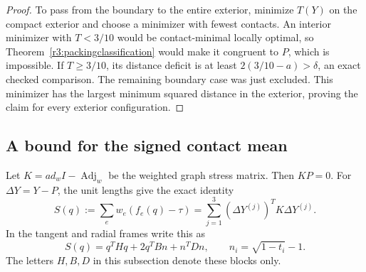 \documentclass[12pt,reqno]{amsart}
\theoremstyle{definition}
\numberwithin{equation}{section}
\begin{document}
\begin{proof}
To pass from the boundary to the entire exterior, minimize $T(Y)$
on the compact exterior and choose a minimizer with fewest contacts.
An interior minimizer with $T<3/10$ would be contact-minimal locally
optimal, so Theorem~\ref{r3:packingclassification} would make it
congruent to $P$, which is impossible. If $T\ge3/10$, its distance
deficit is at least $2(3/10-a)>\delta$, an exact checked comparison.
The remaining boundary case was just excluded. This minimizer has
the largest minimum squared distance in the exterior, proving the
claim for every exterior configuration.
\end{proof}

\subsection{A bound for the signed contact mean}
Let $K=ad_wI-\operatorname{Adj}_w$ be the weighted graph stress matrix.
Then $KP=0$. For $\Delta Y=Y-P$, the unit lengths give the exact identity
\[
 S(q):=\sum_ew_e(f_e(q)-\tau)
       =\sum_{j=1}^3(\Delta Y^{(j)})^TK\Delta Y^{(j)}.
\]
In the tangent and radial frames write this as
\begin{equation}\label{geo:meanblocks}
 S(q)=q^THq+2q^TBn+n^TDn,\qquad n_i=\sqrt{1-t_i}-1.
\end{equation}
The letters $H,B,D$ in this subsection denote these blocks only.
\end{document}
